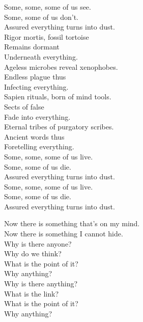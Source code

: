 Some, some, some of us see. \\
Some, some of us don't. \\
Assured everything turns into dust. \\

Rigor mortis, fossil tortoise \\
Remains dormant \\
Underneath everything. \\
Ageless microbes reveal xenophobes. \\
Endless plague thus \\
Infecting everything. \\

Sapien rituals, born of mind tools. \\
Sects of false  \\
Fade into everything. \\
Eternal tribes of purgatory scribes. \\
Ancient words thus \\
Foretelling everything. \\

Some, some, some of us live. \\
Some, some of us die. \\
Assured everything turns into dust. \\

Some, some, some of us live. \\
Some, some of us die. \\
Assured everything turns into dust. \\





Now there is something that's on my mind. \\
Now there is something I cannot hide. \\

Why is there anyone? \\
Why do we think? \\
What is the point of it? \\
Why anything? \\
Why is there anything? \\
What is the link? \\
What is the point of it? \\
Why anything? \\


